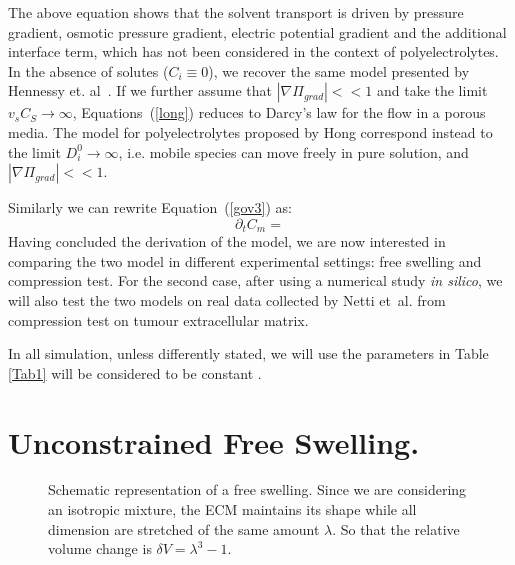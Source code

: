 \documentclass[runningheads]{llncs}
\begin{document}
The above equation shows that the solvent transport is driven by pressure gradient, osmotic pressure gradient, electric potential gradient and the additional interface term, which has not been considered in the context of polyelectrolytes. In the absence of solutes ($C_i\equiv 0$), we recover the same model presented by Hennessy et. al~\cite{sarah}. If we further assume that $|\nabla \Pi_{grad}|<<1$ and take the limit $v_sC_S\rightarrow\infty$, Equations~(\ref{long}) reduces to Darcy's law for the flow in a porous media. The model for polyelectrolytes proposed by Hong \cite{Reviewpolyel} correspond instead to the limit $D^0_i\rightarrow\infty$, i.e. mobile species can move freely in pure solution, and  $|\nabla \Pi_{grad}|<<1$.

Similarly we can rewrite Equation~(\ref{gov3}) as:
\begin{equation}
\partial_t C_m = 
\end{equation}
Having concluded the derivation of the model, we are now interested in comparing the two model in different experimental settings: free swelling and compression test. For the second case, after using a numerical study \textit{in silico}, we will also test the two models on real data collected by Netti et~al. \cite{Netti} from compression test on tumour extracellular matrix. 

In all simulation, unless differently stated, we will use the parameters in Table \ref{Tab1} will be considered to be constant \cite{Netti,ecm2}.
\section{Unconstrained Free Swelling.}
\label{free}
\begin{figure}
	\centering
	\def\svgwidth{0.95\linewidth}
	
	\caption{Schematic representation of a free swelling. Since we are considering an isotropic mixture, the ECM maintains its shape while all dimension are stretched of the same amount $\lambda$. So that the relative volume change is $\delta V = \lambda^3-1$. }
\end{figure}
\end{document}
